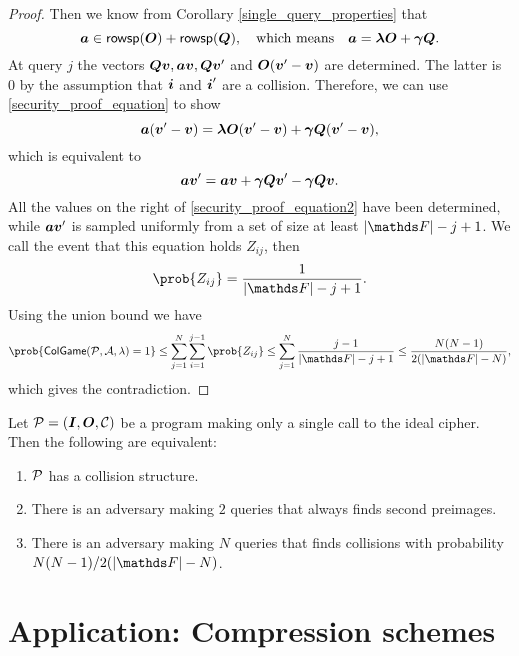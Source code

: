 \begin{proof}
    Then we know from Corollary \ref{single_query_properties} that
    \begin{equation}
    \label{security_proof_equation}
    \va \in \rowsp(\O) + \rowsp(\Q) ,\quad \textrm{which means} \quad \va = \v \lambda \O + \v \gamma \Q.
    \end{equation}
    At query $j$ the vectors $\Q\vv, \va\vv, \Q\vv'$ and $\O(\vv' - \vv)$ are determined.
    The latter is $0$ by the assumption that $\v i$ and $\v i'$ are a collision.
    Therefore, we can use \eqref{security_proof_equation} to show
    \begin{equation*}
    \va (\vv' - \vv) = \v\lambda\O(\vv' - \vv) + \v\gamma \Q (\vv' - \vv),
    \end{equation*}
    which is equivalent to
    \begin{equation}
    \label{security_proof_equation2}
    \va \vv' = \va\vv + \v\gamma \Q \vv' - \v\gamma \Q\vv.
    \end{equation}
    All the values on the right of \eqref{security_proof_equation2} have been determined,
    while $\va\vv'$ is sampled uniformly from a set of size at least $|\F| - j + 1$.
    We call the event that this equation holds $Z_{ij}$, then
    \[
        \prob{Z_{ij}} = \frac{1}{|\F| - j + 1}.
    \]
    Using the union bound we have
    \begin{equation*}
    \prob{\mathsf{ColGame}(\P,\A,\lambda) = 1}
    \leq \sum_{j=1}^N \sum_{i=1}^{j-1} \prob{Z_{ij}}
    \leq \sum_{j=1}^N \frac{j - 1}{|\F| - j + 1}
    \leq \frac{N(N-1)}{2(|\F| - N)},
    \end{equation*}
    which gives the contradiction.
\end{proof}

\begin{corollary}
\label{corollary_single_query_cr_resistance}
    Let $\P = (\I, \O, \C)$ be a program making only a single call to the ideal cipher.
    Then the following are equivalent:
    \begin{enumerate}
    \item $\P$ has a collision structure.
    \item There is an adversary making $2$ queries that always finds second preimages.
    \item There is an adversary making $N$ queries that finds collisions with probability $N(N-1) / 2(|\F| - N)$.
    \end{enumerate}
\end{corollary}

\section{Application: Compression schemes}

